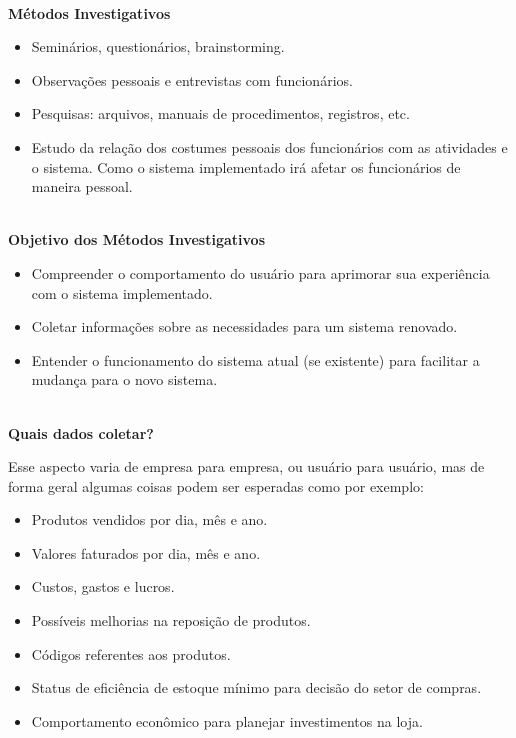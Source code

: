 \documentclass[12pt, a4paper]{article}
\begin{document}
\noindent
\textbf{\\Métodos Investigativos}

\begin{itemize}
    \item Seminários, questionários, brainstorming.
    \item Observações pessoais e entrevistas com funcionários.
    \item Pesquisas: arquivos, manuais de procedimentos, registros, etc.
    \item Estudo da relação dos costumes pessoais dos funcionários com as atividades e o sistema.
    Como o sistema implementado irá afetar os funcionários de maneira pessoal.
\end{itemize}

\newpage
\vspace*{0.5cm}

\noindent
\textbf{\\Objetivo dos Métodos Investigativos}

\begin{itemize}
    \item Compreender o comportamento do usuário 
    para aprimorar sua experiência com o sistema implementado.
    \item Coletar informações sobre as necessidades para um sistema renovado.
    \item Entender o funcionamento do sistema atual (se existente) para facilitar a 
    mudança para o novo sistema.
\end{itemize}

\noindent
\textbf{\\Quais dados coletar?}

Esse aspecto varia de empresa para empresa, ou usuário para usuário, mas de forma geral 
algumas coisas podem ser esperadas como por exemplo:

\begin{itemize}
    \item Produtos vendidos por dia, mês e ano.
    \item Valores faturados por dia, mês e ano.
    \item Custos, gastos e lucros.
    \item Possíveis melhorias na reposição de produtos.
    \item Códigos referentes aos produtos.
    \item Status de eficiência de estoque mínimo para decisão do setor de compras.
    \item Comportamento econômico para planejar investimentos na loja.
\end{itemize}
\end{document}
